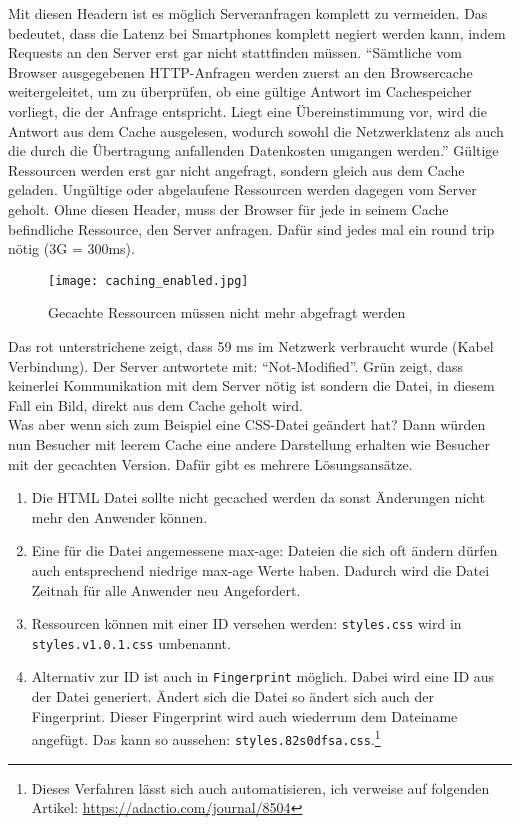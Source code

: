 		  Mit diesen Headern ist es möglich Serveranfragen komplett zu vermeiden. Das bedeutet, dass die Latenz bei Smartphones komplett negiert werden kann, indem Requests an den Server erst gar nicht stattfinden müssen. "`Sämtliche vom Browser ausgegebenen HTTP-Anfragen werden zuerst an den Browsercache weitergeleitet, um zu überprüfen, ob eine gültige Antwort im Cachespeicher vorliegt, die der Anfrage entspricht. Liegt eine Übereinstimmung vor, wird die Antwort aus dem Cache ausgelesen, wodurch sowohl die Netzwerklatenz als auch die durch die Übertragung anfallenden Datenkosten umgangen werden."'\autocite{grigorikCaching} Gültige Ressourcen werden erst gar nicht angefragt, sondern gleich aus dem Cache geladen. Ungültige oder abgelaufene Ressourcen werden dagegen vom Server geholt. Ohne diesen Header, muss der Browser für jede in seinem Cache befindliche Ressource, den Server anfragen. Dafür sind jedes mal ein round trip nötig (3G = 300ms).\\

		  \begin{figure}[htbp]
		  	\begin{center}
		  		\texttt{[image: caching\_enabled.jpg]}
		  		\caption{Gecachte Ressourcen müssen nicht mehr abgefragt werden}
		  		\label{fig:caching_enabled}
		  	\end{center}
		  \end{figure}
		  
		  Das rot unterstrichene zeigt, dass 59 ms im Netzwerk verbraucht wurde (Kabel Verbindung). Der Server antwortete mit: "`Not-Modified"'. Grün zeigt, dass keinerlei Kommunikation mit dem Server nötig ist sondern die Datei, in diesem Fall ein Bild, direkt aus dem Cache geholt wird.\\
		 
		  Was aber wenn sich zum Beispiel eine CSS-Datei geändert hat? Dann würden nun Besucher mit leerem Cache eine andere Darstellung erhalten wie Besucher mit der gecachten Version. Dafür gibt es mehrere Lösungsansätze.

		  \begin{enumerate}
		  	\item Die HTML Datei sollte nicht gecached werden da sonst Änderungen nicht mehr den Anwender können.
		  	\item Eine für die Datei angemessene max-age: Dateien die sich oft ändern dürfen auch entsprechend niedrige max-age Werte haben. Dadurch wird die Datei Zeitnah für alle Anwender neu Angefordert.
		  	\item Ressourcen können mit einer ID versehen werden: \texttt{styles.css} wird in \texttt{styles.v1.0.1.css} umbenannt.
		  	\item Alternativ zur ID ist auch in \texttt{Fingerprint} möglich. Dabei wird eine ID aus der Datei generiert. Ändert sich die Datei so ändert sich auch der Fingerprint. Dieser Fingerprint wird auch wiederrum dem Dateiname angefügt. Das kann so aussehen: \texttt{styles.82s0dfsa.css}.\footnote{Dieses Verfahren lässt sich auch automatisieren, ich verweise auf folgenden Artikel: \url{https://adactio.com/journal/8504}}
		  \end{enumerate}

